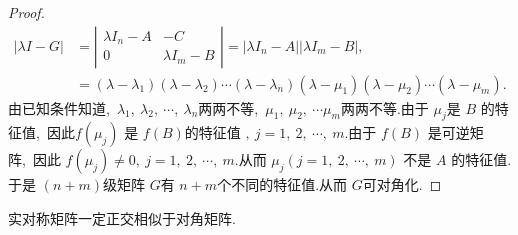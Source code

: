 \begin{proof}
	$$\begin{aligned}
		|\lambda I-G| & =\left|\begin{array}{cc}
			\lambda I_{n}-A & -C \\
			0 & \lambda I_{m}-B
		\end{array}\right|=\left|\lambda I_{n}-A\right|\left|\lambda I_{m}-B\right|,\  \\
		& =\left(\lambda-\lambda_{1}\right)\left(\lambda-\lambda_{2}\right) \cdots\left(\lambda-\lambda_{n}\right)\left(\lambda-\mu_{1}\right)\left(\lambda-\mu_{2}\right) \cdots\left(\lambda-\mu_{m}\right) .
	\end{aligned}$$
	由已知条件知道,\  $ \lambda_{1},\  \lambda_{2},\  \cdots,\  \lambda_{n}  $两两不等,\  $ \mu_{1},\  \mu_{2},\  \cdots \mu_{m}  $两两不等.由于  $\mu_{j}  $是  $B $ 的特征值,\  因此$  f\left(\mu_{j}\right) $ 是  $f(B)  $的特征值 $,\ j=1,\ 2,\  \cdots,\  m  .$由于  $f(B) $ 是可逆矩阵,\  因此  $f\left(\mu_{j}\right) \neq 0 ,\   j=1,\ 2,\  \cdots,\  m . $从而  $\mu_{j}(j=1,\ 2,\  \cdots,\  m) $ 不是  $A$  的特征值.于是 $ (n+m)  $级矩阵 $ G  $有 $ n+m  $个不同的特征值.从而 $ G  $可对角化.
\end{proof}
\newpage
\begin{theorem}
	实对称矩阵一定正交相似于对角矩阵.
\end{theorem}
